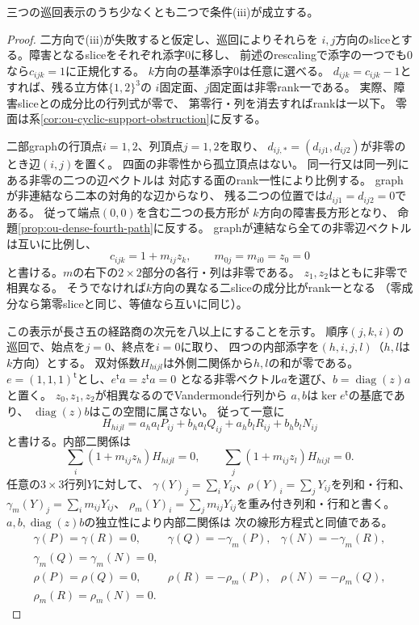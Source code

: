 \begin{theorem}[核rank障害の巡回は高々一つ]
\label{thm:ou-dense-at-most-one-torus-failure}
三つの巡回表示のうち少なくとも二つで条件(iii)が成立する。
\end{theorem}
\begin{proof}
二方向で(iii)が失敗すると仮定し、巡回によりそれらを
$i,j$方向のsliceとする。障害となるsliceをそれぞれ添字0に移し、
前述のrescalingで添字の一つでも0なら$c_{ijk}=1$に正規化する。
$k$方向の基準添字0は任意に選べる。
$d_{ijk}=c_{ijk}-1$とすれば、残る立方体$\{1,2\}^3$の
$i$固定面、$j$固定面は非零rank一である。
実際、障害sliceとの成分比の行列式が零で、
第零行・列を消去すればrankは一以下。
零面は系\ref{cor:ou-cyclic-support-obstruction}に反する。

二部graphの行頂点$i=1,2$、列頂点$j=1,2$を取り、
$d_{ij,*}=(d_{ij1},d_{ij2})$が非零のとき辺$(i,j)$を置く。
四面の非零性から孤立頂点はない。
同一行又は同一列にある非零の二つの辺ベクトルは
対応する面のrank一性により比例する。
graphが非連結なら二本の対角的な辺からなり、
残る二つの位置では$d_{ij1}=d_{ij2}=0$である。
従って端点$(0,0)$を含む二つの長方形が
$k$方向の障害長方形となり、
命題\ref{prop:ou-dense-fourth-path}に反する。
graphが連結なら全ての非零辺ベクトルは互いに比例し、
\[
 c_{ijk}=1+m_{ij}z_k,\qquad
 m_{0j}=m_{i0}=z_0=0
\]
と書ける。$m$の右下の$2\times2$部分の各行・列は非零である。
$z_1,z_2$はともに非零で相異なる。
そうでなければ$k$方向の異なる二sliceの成分比がrank一となる
（零成分なら第零sliceと同じ、等値なら互いに同じ）。

この表示が長さ五の経路商の次元を八以上にすることを示す。
順序$(j,k,i)$の巡回で、始点を$j=0$、終点を$i=0$に取り、
四つの内部添字を$(h,i,j,l)$（$h,l$は$k$方向）とする。
双対係数$H_{hijl}$は外側二関係から$h,l$の和が零である。
$e=(1,1,1)^{\mathsf t}$とし、$e^{\mathsf t}a=z^{\mathsf t}a=0$
となる非零ベクトル$a$を選び、$b=\operatorname{diag}(z)a$と置く。
$z_0,z_1,z_2$が相異なるのでVandermonde行列から
$a,b$は$\ker e^{\mathsf t}$の基底であり、
$\operatorname{diag}(z)b$はこの空間に属さない。
従って一意に
\[
 H_{hijl}=a_ha_lP_{ij}+b_ha_lQ_{ij}
             +a_hb_lR_{ij}+b_hb_lN_{ij}
\]
と書ける。内部二関係は
\[
 \sum_i(1+m_{ij}z_h)H_{hijl}=0,\qquad
 \sum_j(1+m_{ij}z_l)H_{hijl}=0 .
\]
任意の$3\times3$行列$Y$に対して、
$\gamma(Y)_j=\sum_iY_{ij}$、$\rho(Y)_i=\sum_jY_{ij}$を列和・行和、
$\gamma_m(Y)_j=\sum_i m_{ij}Y_{ij}$、
$\rho_m(Y)_i=\sum_j m_{ij}Y_{ij}$を重み付き列和・行和と書く。
$a,b,\operatorname{diag}(z)b$の独立性により内部二関係は
次の線形方程式と同値である。
\[
\begin{array}{lll}
 \gamma(P)=\gamma(R)=0,&
 \gamma(Q)=-\gamma_m(P),&
 \gamma(N)=-\gamma_m(R),\\
 \gamma_m(Q)=\gamma_m(N)=0,\\
 \rho(P)=\rho(Q)=0,&
 \rho(R)=-\rho_m(P),&
 \rho(N)=-\rho_m(Q),\\
 \rho_m(R)=\rho_m(N)=0 .
\end{array}
\]


\end{proof}
